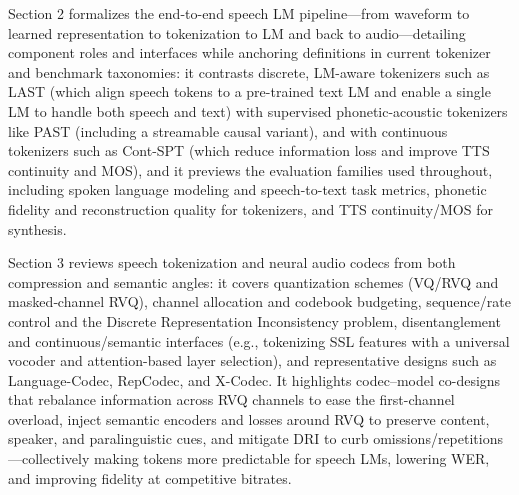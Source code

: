 Section 2 formalizes the end-to-end speech LM pipeline—from waveform to learned representation to tokenization to LM and back to audio—detailing component roles and interfaces while anchoring definitions in current tokenizer and benchmark taxonomies: it contrasts discrete, LM-aware tokenizers such as LAST (which align speech tokens to a pre-trained text LM and enable a single LM to handle both speech and text) with supervised phonetic-acoustic tokenizers like PAST (including a streamable causal variant), and with continuous tokenizers such as Cont-SPT (which reduce information loss and improve TTS continuity and MOS), and it previews the evaluation families used throughout, including spoken language modeling and speech-to-text task metrics, phonetic fidelity and reconstruction quality for tokenizers, and TTS continuity/MOS for synthesis. \cite{li2025continuousspeechtokenizertext,har-tuv2025pastphoneticacousticspeechtokenizer,turetzky2024lastlanguagemodelawarespeechtokenization} 



Section 3 reviews speech tokenization and neural audio codecs from both compression and semantic angles: it covers quantization schemes (VQ/RVQ and masked‑channel RVQ), channel allocation and codebook budgeting, sequence/rate control and the Discrete Representation Inconsistency problem, disentanglement and continuous/semantic interfaces (e.g., tokenizing SSL features with a universal vocoder and attention-based layer selection), and representative designs such as Language-Codec, RepCodec, and X-Codec. It highlights codec–model co-designs that rebalance information across RVQ channels to ease the first-channel overload, inject semantic encoders and losses around RVQ to preserve content, speaker, and paralinguistic cues, and mitigate DRI to curb omissions/repetitions—collectively making tokens more predictable for speech LMs, lowering WER, and improving fidelity at competitive bitrates. \cite{liu2024analyzingmitigatinginconsistencydiscrete,ye2024codecdoesmatterexploringsemanticshortcom,ji2025languagecodecbridgingdiscreterepresentat,huang2024repcodecspeechrepresentationcodectokeniz,mousavi2024howshouldweextractdiscreteaudiotokenssel} 



